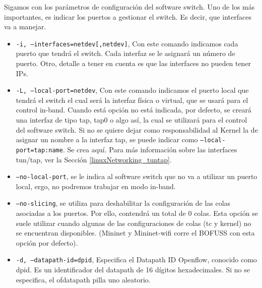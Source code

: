 Sigamos con los parámetros de configuración del software switch. Uno de los más importantes, es indicar los puertos a gestionar el switch. Es decir, que interfaces va a manejar.

\begin{itemize}
    \item \texttt{-i, --interfaces=netdev[,netdev]}, Con este comando indicamos cada puerto que tendrá el switch. Cada interfaz se le asignará un número de puerto. Otro, detalle a tener en cuenta es que las interfaces no pueden tener IPs.

    \item \texttt{-L, --local-port=netdev}, Con este comando indicamos el puerto local que tendrá el switch el cual será la interfaz física o virtual, que se usará para el control in-band. Cuando está opción no está indicada, por defecto, se creará una interfaz de tipo tap, tap0 o algo así, la cual se utilizará para el control del software switch. Si no se quiere dejar como responsabilidad al Kernel la de asignar un nombre a la interfaz tap, se puede indicar como \texttt{--local-port=tap:name}. Se crea aquí. Para más información sobre las interfaces tun/tap, ver la Sección \ref{linuxNetworking_tuntap}.

    \item \texttt{--no-local-port}, se le indica al software switch que no va a utilizar un puerto local, ergo, no podremos trabajar en modo in-band.

    \item \texttt{--no-slicing}, se utiliza para deshabilitar la configuración de las colas asociadas a los puertos. Por ello, contendrá un total de 0 colas. Esta opción se suele utilizar cuando algunas de las configuraciones de colas (tc y kernel) no se encuentran disponibles. (Mininet y Mininet-wifi corre el BOFUSS con esta opción por defecto).

    \item \texttt{-d, --datapath-id=dpid}, Especifica el Datapath ID Openflow, conocido como dpid. Es un identificador del datapath de 16 dígitos hexadecimales. Si no se especifica, el ofdatapath pilla uno aleatorio.
\end{itemize}